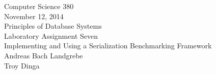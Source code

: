 \documentclass{article}
\begin{document}
\begin{center}
\Huge Computer Science 380
\\
\Huge November 12, 2014
\\
\Huge Principles of Database Systems
\\
\Huge Laboratory Assignment Seven
\\
\Huge Implementing and Using a Serialization Benchmarking Framework
\\
\Huge Andreas Bach Landgrebe
\\
\Huge Troy Dinga

\end{center}
\end{document}
